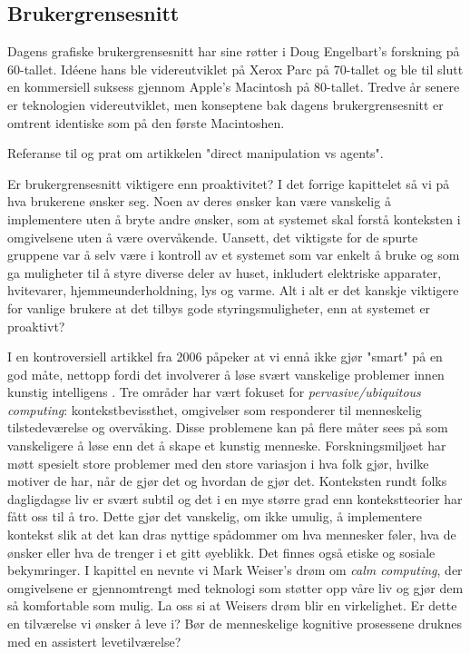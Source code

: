 \subsection{Brukergrensesnitt}
{\color{blue}
Dagens grafiske brukergrensesnitt har sine røtter i Doug Engelbart's forskning på 60-tallet. Idéene hans ble videreutviklet på Xerox Parc på 70-tallet og ble til slutt en kommersiell suksess gjennom Apple's Macintosh på 80-tallet. Tredve år senere er teknologien videreutviklet, men konseptene bak dagens brukergrensesnitt er omtrent identiske som på den første Macintoshen. 

Referanse til og prat om artikkelen "direct manipulation vs agents".

Er brukergrensesnitt viktigere enn proaktivitet?
I det forrige kapittelet så vi på hva brukerene ønsker seg. Noen av deres ønsker kan være vanskelig å implementere uten å bryte andre ønsker, som at systemet skal forstå konteksten i omgivelsene uten å være overvåkende. Uansett, det viktigste for de spurte gruppene var å selv være i kontroll av et systemet som var enkelt å bruke og som ga muligheter til å styre diverse deler av huset, inkludert elektriske apparater, hvitevarer, hjemmeunderholdning, lys og varme. Alt i alt er det kanskje viktigere for vanlige brukere at det tilbys gode styringsmuligheter, enn at systemet er proaktivt?

I en kontroversiell artikkel fra 2006 påpeker \citet{rogers06} at vi ennå ikke gjør "smart" på en god måte, nettopp fordi det involverer å løse svært vanskelige problemer innen kunstig intelligens . Tre områder har vært fokuset for \emph{pervasive/ubiquitous computing}: kontekstbevissthet, omgivelser som responderer til menneskelig tilstedeværelse og overvåking. Disse problemene kan på flere måter sees på som vanskeligere å løse enn det å skape et kunstig menneske. Forskningsmiljøet har møtt spesielt store problemer med den store variasjon i hva folk gjør, hvilke motiver de har, når de gjør det og hvordan de gjør det. Konteksten rundt folks dagligdagse liv er svært subtil og det i en mye større grad enn kontekstteorier har fått oss til å tro. Dette gjør det vanskelig, om ikke umulig, å implementere kontekst slik at det kan dras nyttige spådommer om hva mennesker føler, hva de ønsker eller hva de trenger i et gitt øyeblikk. Det finnes også etiske og sosiale bekymringer. I kapittel en nevnte vi Mark Weiser's drøm om \emph{calm computing}, der omgivelsene er gjennomtrengt med teknologi som støtter opp våre liv og gjør dem så komfortable som mulig. La oss si at Weisers drøm blir en virkelighet. Er dette en tilværelse vi ønsker å leve i? Bør de menneskelige kognitive prosessene druknes med en assistert levetilværelse?

}
